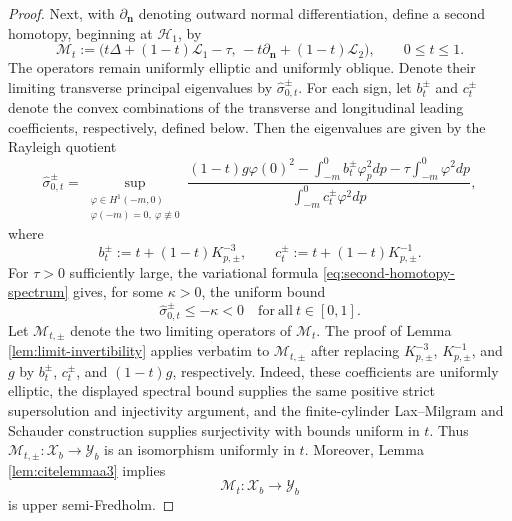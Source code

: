 \documentclass[12pt,letterpaper]{amsart}
\numberwithin{equation}{section}
\begin{document}
\begin{proof}
	{Next, with $\partial_{\boldsymbol n}$ denoting outward normal differentiation, define a second homotopy, beginning at $\mathcal H_1$, by}
	\begin{equation*}
		\mathcal M_t:=
		\bigl(t\Delta+(1-t){\mathscr L_1}-\tau,\,
		-t\partial_{\boldsymbol n}+(1-t){\mathscr L_2}\bigr),
		\qquad0\le t\le1 .
	\end{equation*}
	{The operators remain uniformly elliptic and uniformly oblique. Denote their limiting transverse principal eigenvalues by $\widehat\sigma_{0,t}^\pm$. For each sign, let $b_t^\pm$ and $c_t^\pm$ denote the convex combinations of the transverse and longitudinal leading coefficients, respectively, defined below. Then the eigenvalues are given by the Rayleigh quotient}
	\begin{equation}\label{eq:second-homotopy-spectrum}
	          	\widehat\sigma_{0,t}^\pm=
	          	\sup_{\substack{\varphi\in H^1(-m,0)\\
	          			\varphi(-m)=0,\ \varphi\not\equiv0}}
	          	\frac{(1-t)g\varphi(0)^2-
	          		\displaystyle\int_{-m}^0b_t^\pm\varphi_p^2d p-
	          		\tau\displaystyle\int_{-m}^0\varphi^2d p}
	          	{\displaystyle\int_{-m}^0c_t^\pm\varphi^2d p},
	\end{equation}
	where \begin{equation*}
		b_t^{\pm}:=t+(1-t)K_{p,\pm}^{-3},\qquad c_t^{\pm}:=t+(1-t)K_{p,\pm}^{-1}.
	\end{equation*}
	 {For $\tau>0$ sufficiently large, the variational formula \eqref{eq:second-homotopy-spectrum} gives, for some $\kappa>0$, the uniform bound}
	\begin{equation*}
		\hat{\sigma}_{0,t}^{\pm} \leq -\kappa < 0\quad\mathrm{for~all~}t\in[0,1].
	\end{equation*}
	  	{Let $\mathcal M_{t,\pm}$ denote the two limiting operators of $\mathcal M_t$.}
	{The proof of Lemma \ref{lem:limit-invertibility} applies verbatim to $\mathcal M_{t,\pm}$ after replacing $K_{p,\pm}^{-3}$, $K_{p,\pm}^{-1}$, and $g$ by $b_t^\pm$, $c_t^\pm$, and $(1-t)g$, respectively. Indeed, these coefficients are uniformly elliptic, the displayed spectral bound supplies the same positive strict supersolution and injectivity argument, and the finite-cylinder Lax--Milgram and Schauder construction supplies surjectivity with bounds uniform in $t$. Thus $\mathcal M_{t,\pm}:\mathscr X_b\to\mathscr Y_b$ is an isomorphism uniformly in $t$.} Moreover, Lemma \ref{lem:citelemmaa3} implies
	  \begin{equation*}
	  	\mathcal{M}_t:\mathscr{X}_b\to\mathscr{Y}_b
	  \end{equation*}
	  is upper semi-Fredholm.
	

\end{proof}
\end{document}
